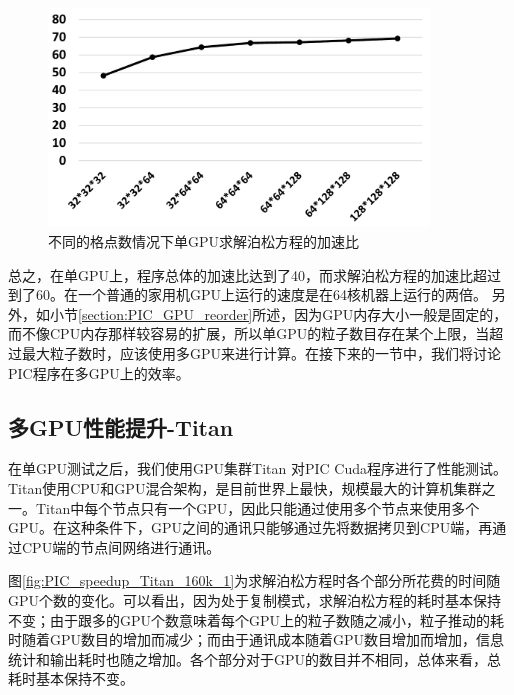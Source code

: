 \begin{figure}[!htb]
  \centering
  \includegraphics[width=0.9\textwidth]{Img/PIC_speedup_1GPU_Poisson.pdf}
  \caption{不同的格点数情况下单GPU求解泊松方程的加速比}
  \label{fig:PIC_speedup_1GPU_Poisson}
\end{figure}

总之，在单GPU上，程序总体的加速比达到了40，而求解泊松方程的加速比超过到了60。在一个普通的家用机GPU上运行的速度是在64核机器上运行的两倍。
另外，如小节\ref{section:PIC_GPU_reorder}所述，因为GPU内存大小一般是固定的，而不像CPU内存那样较容易的扩展，所以单GPU的粒子数目存在某个上限，当超过最大粒子数时，应该使用多GPU来进行计算。在接下来的一节中，我们将讨论PIC程序在多GPU上的效率。

\subsection{多GPU性能提升-Titan}
在单GPU测试之后，我们使用GPU集群Titan 对PIC Cuda程序进行了性能测试。Titan使用CPU和GPU混合架构，是目前世界上最快，规模最大的计算机集群之一。Titan中每个节点只有一个GPU，因此只能通过使用多个节点来使用多个GPU。在这种条件下，GPU之间的通讯只能够通过先将数据拷贝到CPU端，再通过CPU端的节点间网络进行通讯。

图\ref{fig:PIC_speedup_Titan_160k_1}为求解泊松方程时各个部分所花费的时间随GPU个数的变化。可以看出，因为处于复制模式，求解泊松方程的耗时基本保持不变；由于跟多的GPU个数意味着每个GPU上的粒子数随之减小，粒子推动的耗时随着GPU数目的增加而减少；而由于通讯成本随着GPU数目增加而增加，信息统计和输出耗时也随之增加。各个部分对于GPU的数目并不相同，总体来看，总耗时基本保持不变。

